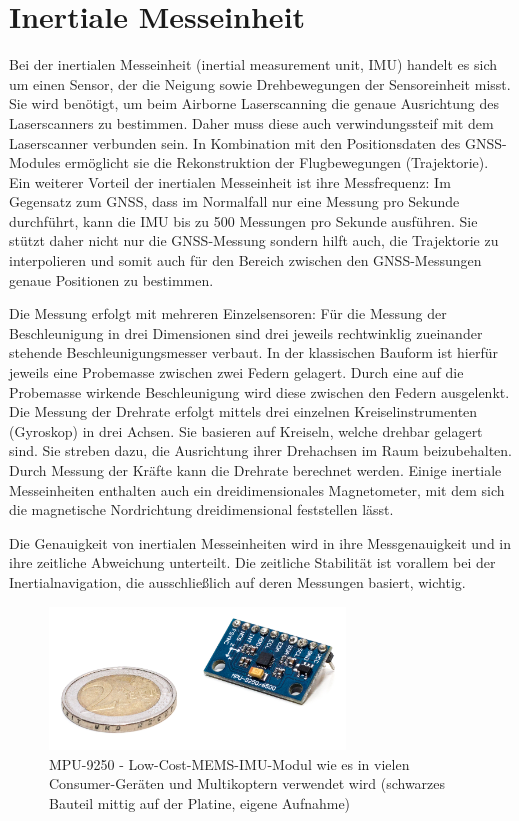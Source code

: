 \documentclass[a4paper,12pt,bibliography=totoc, listof=totoc,titlepage,pointlessnumbers]{scrreprt}
\begin{document}
\section{Inertiale Messeinheit}
\label{s:IMU}
Bei der inertialen Messeinheit (inertial measurement unit, IMU) handelt es sich um einen Sensor, der die Neigung sowie Drehbewegungen der Sensoreinheit misst. Sie wird benötigt, um beim Airborne Laserscanning die genaue Ausrichtung des Laser\-scan\-ners zu bestimmen. Daher muss diese auch verwindungssteif mit dem Laser\-scan\-ner verbunden sein. In Kombination mit den Positionsdaten des GNSS-Modules ermöglicht sie die Rekonstruktion der Flugbewegungen (Trajektorie). Ein weiterer Vorteil der inertialen Messeinheit ist ihre Messfrequenz: Im Gegensatz zum GNSS, dass im Normalfall nur eine Messung pro Sekunde durchführt, kann die IMU bis zu 500 Messungen pro Sekunde ausführen. Sie stützt daher nicht nur die GNSS-Messung sondern hilft auch, die Trajektorie zu interpolieren und somit auch für den Bereich zwischen den GNSS-Messungen genaue Positionen zu bestimmen. \citep[S. 23ff]{beraldin}

Die Messung erfolgt mit mehreren Einzelsensoren: Für die Messung der Beschleunigung in drei Dimensionen sind drei jeweils rechtwinklig zueinander stehende Beschleunigungsmesser verbaut. In der klassischen Bauform ist hierfür jeweils eine Probemasse zwischen zwei Federn gelagert. Durch eine auf die Probemasse wirkende Beschleunigung wird diese zwischen den Federn ausgelenkt. Die Messung der Drehrate erfolgt mittels drei einzelnen Kreiselinstrumenten (Gyroskop) in drei Achsen. Sie basieren auf Kreiseln, welche drehbar gelagert sind. Sie streben dazu, die Ausrichtung ihrer Drehachsen im Raum beizubehalten. Durch Messung der Kräfte kann die Drehrate berechnet werden. Einige inertiale Messeinheiten enthalten auch ein dreidimensionales Magnetometer, mit dem sich die magnetische Nordrichtung dreidimensional feststellen lässt.

Die Genauigkeit von inertialen Messeinheiten wird in ihre Messgenauigkeit und in ihre zeitliche Abweichung unterteilt. Die zeitliche Stabilität ist vorallem bei der Inertialnavigation, die ausschließlich auf deren Messungen basiert, wichtig.

\begin{figure}
 \centering
 \includegraphics[width=0.7\textwidth]{./img/mems.jpg}
 \caption{MPU-9250 - Low-Cost-MEMS-IMU-Modul wie es in vielen Consumer-Geräten und Multikoptern verwendet wird (schwarzes Bauteil mittig auf der Platine, eigene Aufnahme)}
 \label{img:mems}
\end{figure}
\end{document}
